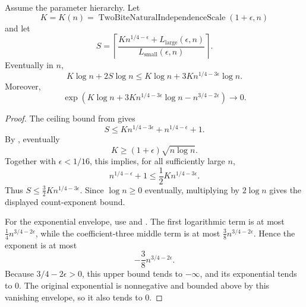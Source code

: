 \begin{helper}
Assume the parameter hierarchy.  Let
\[
  K=K(n)=\operatorname{TwoBiteNaturalIndependenceScale}(1+\epsilon,n)
\]
and let
\[
  S=\left\lceil
    \frac{K n^{1/4-\epsilon}+L_{\mathrm{large}}(\epsilon,n)}
         {L_{\mathrm{small}}(\epsilon,n)}
  \right\rceil .
\]
Eventually in \(n\),
\[
  K\log n+2S\log n
    \le K\log n+3K n^{1/4-3\epsilon}\log n .
\]
Moreover,
\[
  \exp\!\left(
    K\log n+3K n^{1/4-3\epsilon}\log n
      -n^{3/4-2\epsilon}
  \right)\longrightarrow 0 .
\]
\end{helper}
\begin{proof}
The ceiling bound from  gives
\[
  S\le K n^{1/4-3\epsilon}+n^{1/4-\epsilon}+1 .
\]
By , eventually
\[
  K\ge (1+\epsilon)\sqrt{n\log n}.
\]
Together with \(\epsilon<1/16\), this implies, for all sufficiently large
\(n\),
\[
  n^{1/4-\epsilon}+1
    \le \frac12 K n^{1/4-3\epsilon}.
\]
Thus \(S\le \frac32 K n^{1/4-3\epsilon}\).  Since \(\log n\ge 0\)
eventually, multiplying by \(2\log n\) gives the displayed count-exponent
bound.

For the exponential envelope, use 
and .  The first logarithmic term is
at most \(\frac14 n^{3/4-2\epsilon}\), while the coefficient-three middle
term is at most \(\frac38 n^{3/4-2\epsilon}\).  Hence the exponent is at most
\[
  -\frac38 n^{3/4-2\epsilon}.
\]
Because \(3/4-2\epsilon>0\), this upper bound tends to \(-\infty\), and its
exponential tends to \(0\).  The original exponential is nonnegative and
bounded above by this vanishing envelope, so it also tends to \(0\).
\end{proof}
